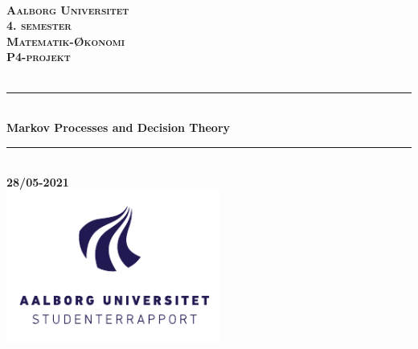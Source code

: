 %
\begin{titlepage}

\thispagestyle{empty}

\newcommand{\HRule}{\rule{\linewidth}{0.5mm}}

\center

\textsc{}\\[2.5cm]
    
\textsc{\textbf{\LARGE Aalborg Universitet}}\\[1.5cm]

\textsc{\textbf{\Large 4. semester}}\\[0.5cm]

\textsc{\textbf{\large Matematik-Økonomi}}\\[0.5cm]

\textsc{\textbf{\large P4-projekt}}\\[0.5cm]

\textsc{\textbf{\large }}\\[0.5cm]

\HRule \\[0.4cm]

{\huge \bfseries Markov Processes and Decision Theory}\\[0.4cm]

\HRule\\[1.5cm]

\textbf{\large 28/05-2021}\\[1cm]

\includegraphics[height=5cm]{Formalia/AAU-logo-stud-DK-RGB.pdf}

\vfill

\end{titlepage}
\pagebreak
\thispagestyle{empty}
\phantom{a}
\clearpage